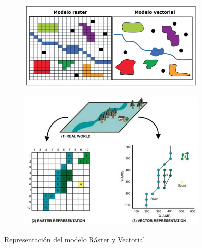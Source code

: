 \begin{figure}[H]
	\centering
	\begin{subfigure}[h]{0.69\textwidth} 
		\includegraphics[width=\textwidth]{imagenes/capitulo2/raster-vectorial}
		\caption{}
	\end{subfigure}       
	\begin{subfigure}[h]{0.74\textwidth} 
		\includegraphics[width=\textwidth]{imagenes/capitulo2/raster-vector-gis-i4}
		\caption{}
	\end{subfigure}
	\caption{Representación del modelo Ráster y Vectorial}
	\label{fig:raster-vectorial}
\end{figure}


